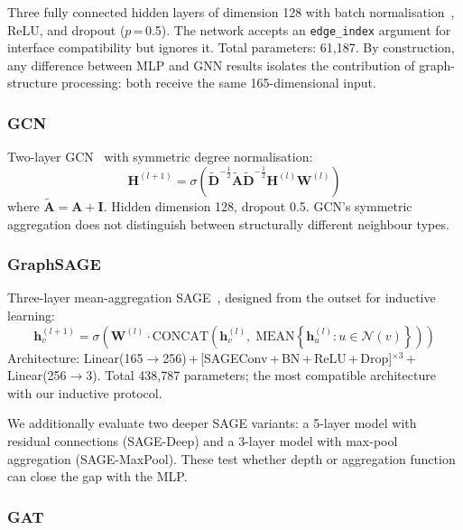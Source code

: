 Three fully connected hidden layers of dimension 128 with batch
normalisation~\citep{ioffe2015batchnorm}, ReLU, and dropout
($p$\,=\,0.5).  The network accepts an \texttt{edge\_index} argument
for interface compatibility but ignores it.  Total parameters: 61,187.
By construction, any difference between MLP and GNN results isolates
the contribution of graph-structure processing: both receive the same
165-dimensional input.

\subsubsection{GCN}

Two-layer GCN~\citep{kipf2017} with symmetric degree normalisation:
\begin{equation}
\mathbf{H}^{(l+1)} = \sigma\!\left(
  \tilde{\mathbf{D}}^{-\tfrac{1}{2}}
  \tilde{\mathbf{A}}
  \tilde{\mathbf{D}}^{-\tfrac{1}{2}}
  \mathbf{H}^{(l)} \mathbf{W}^{(l)}
\right)
\label{eq:gcn}
\end{equation}
where $\tilde{\mathbf{A}} = \mathbf{A}+\mathbf{I}$.  Hidden dimension
128, dropout 0.5.  GCN's symmetric aggregation does not distinguish
between structurally different neighbour types.

\subsubsection{GraphSAGE}

Three-layer mean-aggregation SAGE~\citep{hamilton2017}, designed from
the outset for inductive learning:
\begin{equation}
\mathbf{h}_v^{(l+1)} = \sigma\!\left(
  \mathbf{W}^{(l)} \!\cdot\!
  \text{CONCAT}\!\left(
    \mathbf{h}_v^{(l)},\;
    \text{MEAN}\!\left\{\mathbf{h}_u^{(l)}: u\!\in\!\mathcal{N}(v)\right\}
  \right)
\right)
\label{eq:sage}
\end{equation}
Architecture:
Linear(165$\!\to\!$256)\,+\,[SAGEConv\,+\,BN\,+\,ReLU\,+\,Drop]$^{\times3}$\,+\,Linear(256$\!\to\!$3).
Total 438,787 parameters; the most compatible architecture with our
inductive protocol.

We additionally evaluate two deeper SAGE variants: a 5-layer model
with residual connections (SAGE-Deep) and a 3-layer model with max-pool
aggregation (SAGE-MaxPool).  These test whether depth or aggregation
function can close the gap with the MLP.

\subsubsection{GAT}

